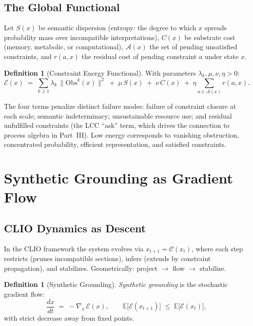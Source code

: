 \documentclass[11pt, letterpaper]{article}
\theoremstyle{plain}
\theoremstyle{definition}
\newtheorem{definition}[theorem]{Definition}
\theoremstyle{remark}
\newcommand{\CC}{\mathcal{C}}
\newcommand{\EE}{\mathcal{E}}
\newcommand{\Obs}{\mathrm{Obs}}
\newcommand{\grad}{\nabla}
\begin{document}
\subsection{The Global Functional}

Let $S(x)$ be semantic dispersion (entropy: the degree to which $x$ spreads
probability mass over incompatible interpretations), $C(x)$ be substrate cost (memory,
metabolic, or computational), $\mathcal{A}(x)$ the set of pending unsatisfied
constraints, and $r(a,x)$ the residual cost of pending constraint $a$ under state $x$.

\begin{definition}[Constraint Energy Functional]
\label{def:energy}
With parameters $\lambda_k, \mu, \nu, \eta > 0$:
\[
  \EE(x)
  \;=\;
  \sum_{k \geq 1} \lambda_k\,\bigl\|\Obs^k(x)\bigr\|^2
  \;+\;
  \mu\, S(x)
  \;+\;
  \nu\, C(x)
  \;+\;
  \eta \sum_{a \in \mathcal{A}(x)} r(a, x).
\]
\end{definition}

The four terms penalize distinct failure modes: failure of constraint closure at each
scale; semantic indeterminacy; unsustainable resource use; and residual unfulfilled
constraints (the LCC ``ask'' term, which drives the connection to process algebra in
Part~III). Low energy corresponds to vanishing obstruction, concentrated probability,
efficient representation, and satisfied constraints.

\section{Synthetic Grounding as Gradient Flow}

\subsection{CLIO Dynamics as Descent}

In the CLIO framework the system evolves via $x_{t+1} = \CC(x_t)$, where each step
restricts (prunes incompatible sections), infers (extends by constraint propagation),
and stabilizes. Geometrically: project $\to$ flow $\to$ stabilize.

\begin{definition}[Synthetic Grounding]
\emph{Synthetic grounding} is the stochastic gradient flow:
\[
  \frac{dx}{dt} \;=\; -\grad_x\,\EE(x),
  \qquad
  \mathbb{E}\bigl[\EE(x_{t+1})\bigr] \;\leq\; \mathbb{E}\bigl[\EE(x_t)\bigr],
\]
with strict decrease away from fixed points.
\end{definition}
\end{document}
